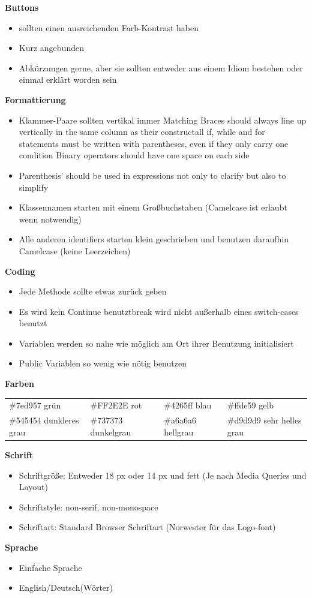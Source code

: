 \documentclass[11pt]{article}
\begin{document}
\textbf{Buttons}
\begin{itemize}
\item sollten einen ausreichenden Farb-Kontrast haben
\item Kurz angebunden
\item Abkürzungen gerne, aber sie sollten entweder aus einem Idiom bestehen oder einmal erklärt worden sein\\
\end{itemize}

\textbf{Formattierung}
\begin{itemize}
\item Klammer-Paare sollten vertikal immer Matching Braces should always line up vertically in the same column as their constructall if, while and for statements must be written with parentheses, even if they only carry one condition
Binary operators should have one space on each side
\item Parenthesis' should be used in expressions not only to clarify but also to simplify
\item Klassennamen starten mit einem Großbuchstaben (Camelcase ist erlaubt wenn notwendig)
\item Alle anderen identifiers starten klein geschrieben und benutzen daraufhin Camelcase (keine Leerzeichen)\\
\end{itemize}

\textbf{Coding}
\begin{itemize}
\item Jede Methode sollte etwas zurück geben
\item Es wird kein Continue benutztbreak wird nicht außerhalb eines switch-cases benutzt
\item Variablen werden so nahe wie möglich am Ort ihrer Benutzung initialisiert
\item Public Variablen so wenig wie nötig benutzen\\
\end{itemize}

\textbf{Farben}

\begin{tabular}{llll}
\#7ed957    grün & \#FF2E2E    rot & \#4265ff    blau & \#ffde59    gelb \\
\#545454    dunkleres grau & \#737373    dunkelgrau & \#a6a6a6    hellgrau & \#d9d9d9    sehr helles grau\\
\end{tabular}
\pagebreak

\begin{large}\textbf{Schrift}\end{large}
\begin{itemize}
\item Schriftgröße: Entweder 18 px oder 14 px und fett (Je nach Media Queries und Layout)
\item Schriftstyle: non-serif, non-monospace
\item Schriftart: Standard Browser Schriftart (Norwester für das Logo-font)\\
\end{itemize}

\textbf{Sprache}
\begin{itemize}
\item Einfache Sprache
\item English/Deutsch(Wörter)\\
\end{itemize}

\pagebreak
\printbibliography
\end{document}
